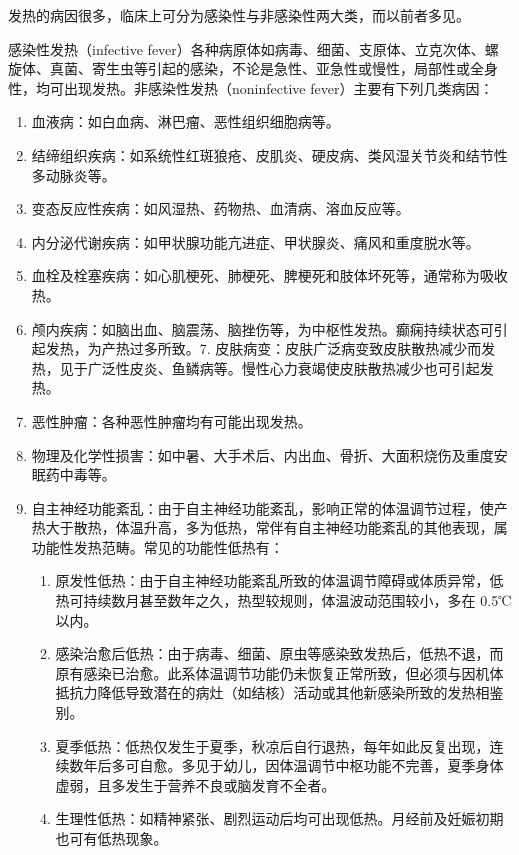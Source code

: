 \documentclass[9pt,a4paper,twoside]{rho-class/rho}
\begin{document}
    发热的病因很多，临床上可分为感染性与非感染性两大类，而以前者多见。

    感染性发热（infective fever）各种病原体如病毒、细菌、支原体、立克次体、螺旋体、真菌、寄生虫等引起的感染，不论是急性、亚急性或慢性，局部性或全身性，均可出现发热。非感染性发热（noninfective fever）主要有下列几类病因：
    
    \begin{enumerate}
    \item 血液病：如白血病、淋巴瘤、恶性组织细胞病等。
    \item 结缔组织疾病：如系统性红斑狼疮、皮肌炎、硬皮病、类风湿关节炎和结节性多动脉炎等。
    \item 变态反应性疾病：如风湿热、药物热、血清病、溶血反应等。
    \item 内分泌代谢疾病：如甲状腺功能亢进症、甲状腺炎、痛风和重度脱水等。
    \item 血栓及栓塞疾病：如心肌梗死、肺梗死、脾梗死和肢体坏死等，通常称为吸收热。
    \item 颅内疾病：如脑出血、脑震荡、脑挫伤等，为中枢性发热。癫痫持续状态可引起发热，为产热过多所致。7. 皮肤病变：皮肤广泛病变致皮肤散热减少而发热，见于广泛性皮炎、鱼鳞病等。慢性心力衰竭使皮肤散热减少也可引起发热。
    \item 恶性肿瘤：各种恶性肿瘤均有可能出现发热。
    \item 物理及化学性损害：如中暑、大手术后、内出血、骨折、大面积烧伤及重度安眠药中毒等。
    \item 自主神经功能紊乱：由于自主神经功能紊乱，影响正常的体温调节过程，使产热大于散热，体温升高，多为低热，常伴有自主神经功能紊乱的其他表现，属功能性发热范畴。常见的功能性低热有：
        \begin{enumerate}
        \item 原发性低热：由于自主神经功能紊乱所致的体温调节障碍或体质异常，低热可持续数月甚至数年之久，热型较规则，体温波动范围较小，多在 0.5℃ 以内。
        \item 感染治愈后低热：由于病毒、细菌、原虫等感染致发热后，低热不退，而原有感染已治愈。此系体温调节功能仍未恢复正常所致，但必须与因机体抵抗力降低导致潜在的病灶（如结核）活动或其他新感染所致的发热相鉴别。
        \item 夏季低热：低热仅发生于夏季，秋凉后自行退热，每年如此反复出现，连续数年后多可自愈。多见于幼儿，因体温调节中枢功能不完善，夏季身体虚弱，且多发生于营养不良或脑发育不全者。
        \item 生理性低热：如精神紧张、剧烈运动后均可出现低热。月经前及妊娠初期也可有低热现象。
        \end{enumerate}
    \end{enumerate}
\end{document}
